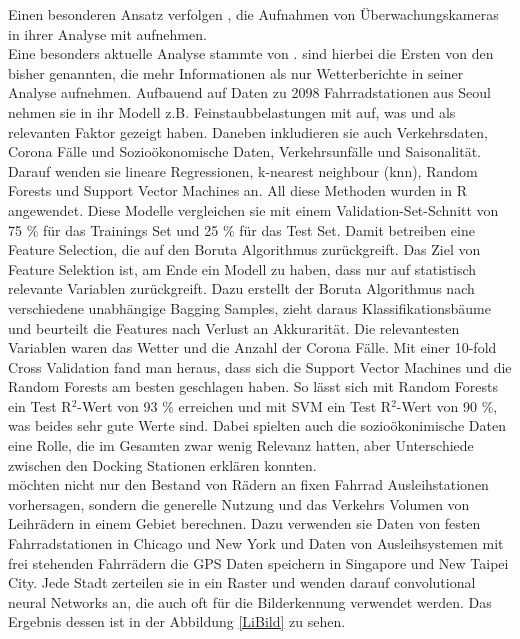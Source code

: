\documentclass[a4paper,12pt]{thesis}
\begin{document}
Einen besonderen Ansatz verfolgen \cite{Colace2020}, die Aufnahmen von Überwachungskameras in ihrer Analyse mit aufnehmen.\\
Eine besonders aktuelle Analyse stammte von \cite{Gao2022}. \cite{Gao2022} sind hierbei die Ersten von den bisher genannten, die mehr Informationen als nur Wetterberichte in seiner Analyse aufnehmen. Aufbauend auf Daten zu 2098 Fahrradstationen aus Seoul nehmen sie in ihr Modell z.B. Feinstaubbelastungen mit auf, was \cite{Hong2022} und \cite{ZHAO2018826} als relevanten Faktor gezeigt haben. Daneben inkludieren sie auch Verkehrsdaten, Corona Fälle und Sozioökonomische Daten, Verkehrsunfälle und Saisonalität. Darauf wenden sie lineare Regressionen, k-nearest neighbour (knn), Random Forests und Support Vector Machines an. All diese Methoden wurden in R angewendet. Diese Modelle vergleichen sie mit einem Validation-Set-Schnitt von 75 \% für das Trainings Set und 25 \% für das Test Set. Damit betreiben \cite{Gao2022} eine Feature Selection, die auf den Boruta Algorithmus zurückgreift. Das Ziel von Feature Selektion ist, am Ende ein Modell zu haben, dass nur auf statistisch relevante Variablen zurückgreift. Dazu erstellt der Boruta Algorithmus nach \cite{Kursa2010} verschiedene unabhängige Bagging Samples, zieht daraus Klassifikationsbäume und beurteilt die Features nach Verlust an Akkurarität. Die relevantesten Variablen waren das Wetter und die Anzahl der Corona Fälle. Mit einer 10-fold Cross Validation fand man heraus, dass sich die Support Vector Machines und die Random Forests am besten geschlagen haben. So lässt sich mit Random Forests ein Test R$^2$-Wert von 93 \% erreichen und mit SVM ein Test R$^2$-Wert von 90 \%, was beides sehr gute Werte sind. Dabei spielten auch die sozioökonimische Daten eine Rolle, die im Gesamten zwar wenig Relevanz hatten, aber Unterschiede zwischen den Docking Stationen erklären konnten.\\ 
\cite{Li2022} möchten nicht nur den Bestand von Rädern an fixen Fahrrad Ausleihstationen vorhersagen, sondern die generelle Nutzung und das Verkehrs Volumen von Leihrädern in einem Gebiet berechnen. Dazu verwenden sie Daten von festen Fahrradstationen in Chicago und New York und Daten von Ausleihsystemen mit frei stehenden Fahrrädern die GPS Daten speichern in Singapore und New Taipei City. Jede Stadt zerteilen sie in ein Raster und wenden darauf convolutional neural Networks an, die auch oft für die Bilderkennung verwendet werden. Das Ergebnis dessen ist in der Abbildung \ref{LiBild} zu sehen.\\
\end{document}
